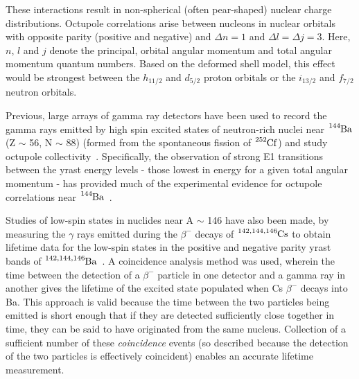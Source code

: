 \documentclass[12pt,a4paper]{article}
\begin{document}
\medskip
\noindent
These interactions result in non-spherical (often pear-shaped) nuclear charge distributions.
Octupole correlations arise between nucleons in nuclear orbitals with opposite parity (positive and negative) and $\Delta n = 1$ and $\Delta l = \Delta j = 3$.
Here, $n$, $l$ and $j$ denote the principal, orbital angular momentum and total angular momentum quantum numbers.
Based on the deformed shell model, this effect would be strongest between the $h_{11/2}$ and $d_{5/2}$ proton orbitals or the $i_{13/2}$ and $f_{7/2}$ neutron orbitals.

\medskip
\noindent
Previous, large arrays of gamma ray detectors have been used to record the gamma rays emitted by high spin excited states of neutron-rich nuclei  near $\ce{^{144}Ba}$ (Z $\sim$ 56, N $\sim$ 88) (formed from the spontaneous fission of $\ce{^{252}Cf}$) and study octupole collectivity~\cite{phillips_octupole_1988,chen_search_2006}.
Specifically, the observation of strong E1 transitions between the yrast energy levels - those lowest in energy for a given total angular momentum - has provided much of the experimental evidence for octupole correlations near $\ce{^{144}Ba}$~\cite{casten_nuclear_1990}.

\medskip
\noindent
Studies of low-spin states in nuclides near A $\sim$ 146 have also been made, by measuring the $\gamma$ rays emitted during the $\beta^-$ decays of $\ce{^{142,144,146}Cs}$ to obtain lifetime data for the low-spin states in the positive and negative parity yrast bands of $\ce{^{142,144,146}Ba}$~\cite{mach_influence_1990}.
A coincidence analysis method was used, wherein the time between the detection of a $\beta^-$ particle in one detector and a gamma ray in another gives the lifetime of the excited state populated when Cs $\beta^-$ decays into Ba.
This approach is valid because the time between the two particles being emitted is short enough that if they are detected sufficiently close together in time, they can be said to have originated from the same nucleus.
Collection of a sufficient number of these \textit{coincidence} events (so described because the detection of the two particles is effectively coincident) enables an accurate lifetime measurement.
\end{document}
